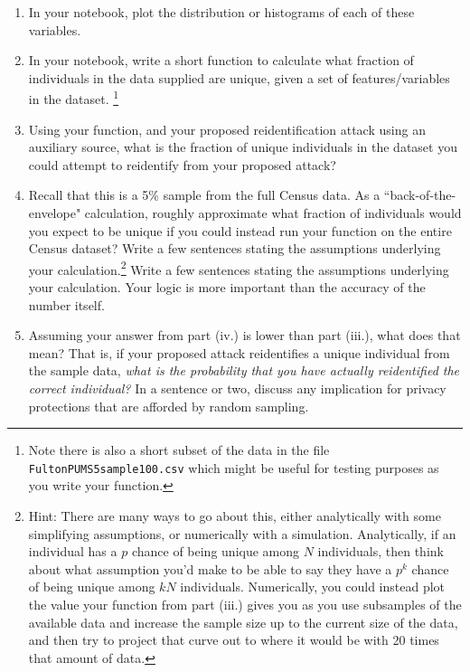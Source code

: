 \documentclass[11pt]{article}
\begin{document}
\begin{enumerate}[leftmargin=*]
\begin{enumerate}
    \begin{enumerate}
        \item In your notebook, plot the distribution or histograms of each of these variables. 
        \item In your notebook, write a short function to calculate what fraction of individuals in the data supplied are unique, given a set of features/variables in the dataset. \footnote{Note there is also a short subset of the data in the file \texttt{FultonPUMS5sample100.csv} which might be useful for testing purposes as you write your function.}
        \item Using your function, and your proposed reidentification attack using an auxiliary source, what is the fraction of unique individuals in the dataset you could attempt to reidentify from your proposed attack?  
        \item Recall that this is a 5\% sample from the full Census data.   As a ``back-of-the-envelope" calculation, roughly approximate what fraction of individuals would you expect to be unique if you could instead run your function on the entire Census dataset? Write a few sentences stating the assumptions underlying your calculation.\footnote{Hint: There are many ways to go about this, either analytically with some simplifying assumptions, or numerically with a simulation.  Analytically, if an individual has a $p$ chance of being unique among $N$ individuals, then think about what assumption you'd make to be able to say they have a $p^k$ chance of being unique among $kN$ individuals.  
        Numerically, you could instead plot the value your function from part (iii.) gives you as you use subsamples of the available data and increase the sample size up to the current size of the data, and then try to project that curve out to where it would be with 20 times that amount of data.} Write a few sentences stating the assumptions underlying your calculation.  Your logic is more important than the accuracy of the number itself.  
        \item Assuming your answer from part (iv.) is lower than part (iii.), what does that mean? That is, if your proposed attack reidentifies a unique individual from the sample data, \emph{what is the probability that you have actually reidentified the correct individual?}  In a sentence or two, discuss any implication for privacy protections that are afforded by random sampling.
    \end{enumerate}


\end{enumerate}
\end{enumerate}
\end{document}
